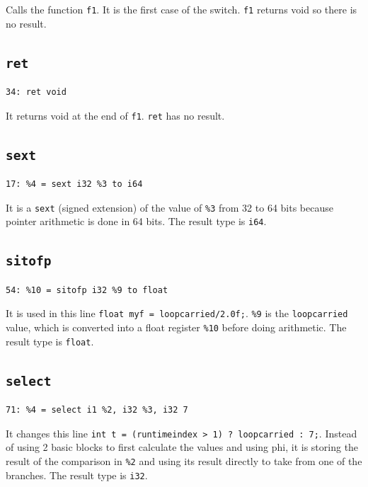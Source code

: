 \documentclass[11pt,a4paper]{article}
\begin{document}
Calls the function \texttt{f1}. It is the first case of the switch. \texttt{f1}
returns void so there is no result.

\subsection*{\texttt{ret}}

\begin{lstlisting}
34: ret void
\end{lstlisting}

It returns void at the end of \texttt{f1}. \texttt{ret} has no result.

\subsection*{\texttt{sext}}

\begin{lstlisting}
17: %4 = sext i32 %3 to i64
\end{lstlisting}

It is a \texttt{sext} (signed extension) of the value of \texttt{\%3} from 32 to 64
bits because pointer arithmetic is done in 64 bits. The result type is
\texttt{i64}.

\subsection*{\texttt{sitofp}}

\begin{lstlisting}
54: %10 = sitofp i32 %9 to float
\end{lstlisting}

It is used in this line \texttt{float myf = loopcarried/2.0f;}. \texttt{\%9} is the
\texttt{loopcarried} value, which is converted into a float register \texttt{\%10}
before doing arithmetic. The result type is \texttt{float}.

\subsection*{\texttt{select}}

\begin{lstlisting}
71: %4 = select i1 %2, i32 %3, i32 7
\end{lstlisting}

It changes this line \texttt{int t = (runtimeindex > 1) ? loopcarried : 7;}.
Instead of using 2 basic blocks to first calculate the values and using phi, it
is storing the result of the comparison in \texttt{\%2} and using its result directly
to take from one of the branches. The result type is \texttt{i32}.
\end{document}
